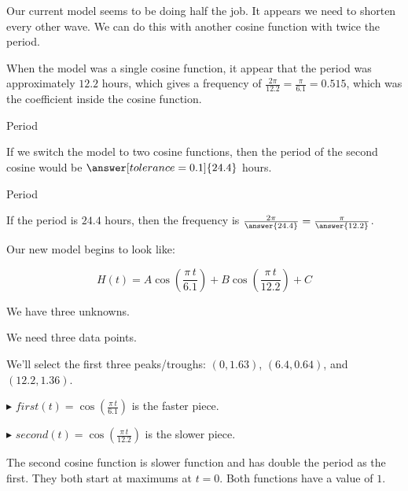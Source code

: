 \documentclass{ximera}
\begin{document}
Our current model seems to be doing half the job.  It appears we need to shorten every other wave.  We can do this with another cosine function with twice the period. 



When the model was a single cosine function, it appear that the period was approximately $12.2$ hours, which gives a frequency of $\frac{2 \pi}{12.2} = \frac{\pi}{6.1} = 0.515$, which was the coefficient inside the cosine function.  



\begin{question}  Period

If we switch the model to two cosine functions, then the period of the second cosine would be $\answer[tolerance=0.1]{24.4}$ hours.


\end{question}




\begin{question}  Period

If the period is $24.4$ hours, then the frequency is $\frac{2 \pi}{\answer{24.4}} = \frac{\pi}{\answer{12.2}}$.


\end{question}









Our new model begins to look like:

\[   H(t) = A \cos\left( \frac{\pi \, t}{6.1} \right) + B \cos\left( \frac{\pi \, t}{12.2} \right) + C       \]


We have three unknowns. 

We need three data points. 


We'll select the first three peaks/troughs:  $(0, 1.63)$, $(6.4, 0.64)$, and $(12.2, 1.36)$. 



\textbf{\textcolor{blue!55!black}{$\blacktriangleright$}} $first(t) = \cos\left( \frac{\pi \, t}{6.1} \right)$ is the faster piece. 


\textbf{\textcolor{blue!55!black}{$\blacktriangleright$}} $second(t) = \cos\left( \frac{\pi \, t}{12.2} \right)$ is the slower piece. 




The second cosine function is slower function and has double the period as the first.  They both start at maximums at $t=0$.  Both functions have a value of $1$. 
\end{document}

